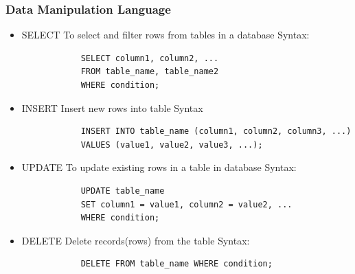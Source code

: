 \documentclass{article}
\begin{document}
\subsubsection{Data Manipulation Language}
    \begin{itemize}
        \item {SELECT}\newline
        To select and filter rows from tables in a database\newline
        Syntax: 
        \begin{verbatim}
            SELECT column1, column2, ...
            FROM table_name, table_name2
            WHERE condition;
        \end{verbatim}
    
    
        \item INSERT
        \newline Insert new rows into table
        \newline Syntax
        \begin{verbatim}
            INSERT INTO table_name (column1, column2, column3, ...)
            VALUES (value1, value2, value3, ...);
        \end{verbatim}
 
        \item {UPDATE}\newline
        To update existing rows in a table in database\newline
        Syntax: 
        \begin{verbatim}
            UPDATE table_name
            SET column1 = value1, column2 = value2, ...
            WHERE condition;
        \end{verbatim}
        
        \item DELETE
        \newline Delete records(rows) from the table
        \newline Syntax:
        \begin{verbatim}
            DELETE FROM table_name WHERE condition;
        \end{verbatim}
    \end{itemize}
    
 
\end{document}
